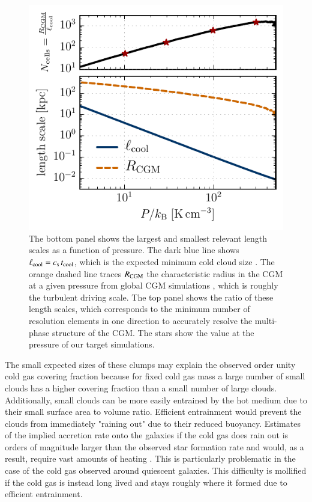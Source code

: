 \documentclass[11pt,letterpaper,english]{article}
\begin{document}
\begin{figure}[t]
    \centering
    \begin{minipage}{0.425\textwidth}
	\caption{ The bottom panel shows the largest and smallest relevant length scales as a function of pressure. The dark blue line shows $\ell_{\rm cool} = c_{\rm s} \, t_{\rm cool}$, which is the expected minimum cold cloud size \cite{McCourt18}. The orange dashed line traces $R_{\rm CGM}$ the characteristic radius in the CGM at a given pressure from global CGM simulations \cite{Fielding17}, which is roughly the turbulent driving scale. The top panel shows the ratio of these length scales, which corresponds to the minimum number of resolution elements in one direction to accurately resolve the multi-phase structure of the CGM.  The stars show the value at the pressure of our target simulations. \label{fig:cs_tcool}}
    \end{minipage}\hfill
    \begin{minipage}{0.575\textwidth}
        \includegraphics[width=\textwidth]{length_scales_sim.pdf} 
    \end{minipage}
\end{figure}


The small expected sizes of these clumps may explain the observed order unity cold gas covering fraction because for fixed cold gas mass a large number of small clouds has a higher covering fraction than a small number of large clouds. Additionally, small clouds can be more easily entrained by the hot medium due to their small surface area to volume ratio. Efficient entrainment would prevent the clouds from immediately "raining out" due to their reduced buoyancy. Estimates of the implied accretion rate onto the galaxies if the cold gas does rain out is orders of magnitude larger than the observed star formation rate and would, as a result, require vast amounts of heating \cite{McQuinnWerk}. This is particularly problematic in the case of the cold gas observed around quiescent galaxies. This difficulty is mollified if the cold gas is instead long lived and stays roughly where it formed due to efficient entrainment.
\end{document}
